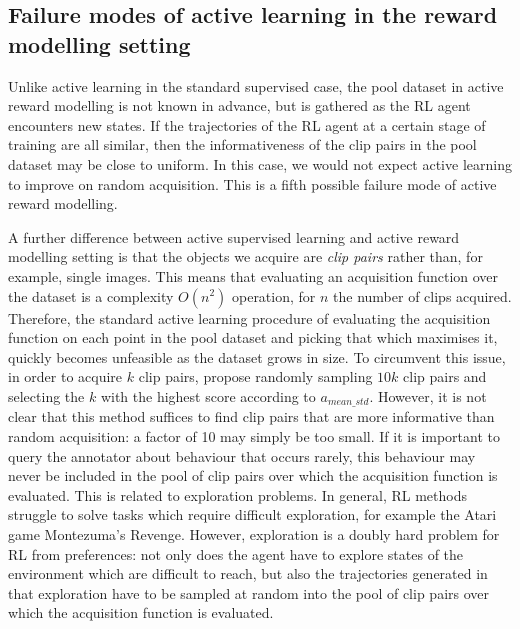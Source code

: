 \documentclass[11pt, a4paper, bibliography=totoc]{report}
\newcommand{\rp}{\hat{r}}
\begin{document}
\subsection{Failure modes of active learning in the reward modelling setting} \label{sec:failure2}
Unlike active learning in the standard supervised case, the pool dataset in active reward modelling is not known in advance, but is gathered as the RL agent encounters new states. If the trajectories of the RL agent at a certain stage of training are all similar, then the informativeness of the clip pairs in the pool dataset may be close to uniform. In this case, we would not expect active learning to improve on random acquisition. This is a fifth possible failure mode of active reward modelling.

A further difference between active supervised learning and active reward modelling setting is that the objects we acquire are \textit{clip pairs} rather than, for example, single images. This means that evaluating an acquisition function over the dataset is a complexity $ O(n^2) $ operation, for $ n $ the number of clips acquired. Therefore, the standard active learning procedure of evaluating the acquisition function on each point in the pool dataset and picking that which maximises it, quickly becomes unfeasible as the dataset grows in size. To circumvent this issue, in order to acquire $ k $ clip pairs, \cite{Christiano2017} propose randomly sampling $ 10k $ clip pairs and selecting the $ k $ with the highest score according to $ a_{mean\_std} $. However, it is not clear that this method suffices to find clip pairs that are more informative than random acquisition: a factor of 10 may simply be too small. If it is important to query the annotator about behaviour that occurs rarely, this behaviour may never be included in the pool of clip pairs over which the acquisition function is evaluated. This is related to exploration problems. In general, RL methods struggle to solve tasks which require difficult exploration, for example the Atari game Montezuma's Revenge. However, exploration is a doubly hard problem for RL from preferences: not only does the agent have to explore states of the environment which are difficult to reach, but also the trajectories generated in that exploration have to be sampled at random into the pool of clip pairs over which the acquisition function is evaluated.
\end{document}
